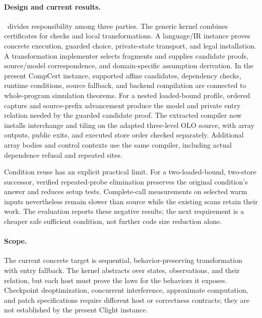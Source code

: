 \paragraph{Design and current results.}
\guardcert\ divides responsibility among three parties. The generic kernel
combines certificates for checks and local transformations. A language/IR
instance proves concrete execution, guarded choice, private-state transport,
and legal installation. A transformation implementer selects fragments and
supplies candidate proofs, source/model correspondence, and domain-specific
assumption derivation. In the present CompCert instance, supported affine
candidates, dependency checks, runtime conditions, source fallback, and backend
compilation are connected to whole-program simulation theorems. For a nested
loaded-bound profile, ordered capture and source-prefix advancement produce
the model and private entry relation needed by the guarded candidate proof.
The extracted compiler now installs interchange and tiling on the adapted
three-level OLO source, with array outputs, public exits, and executed store
order checked separately. Additional array bodies and control contexts use the
same compiler, including actual dependence refusal and repeated sites.

Condition reuse has an explicit practical limit. For a two-loaded-bound,
two-store successor, verified repeated-probe elimination preserves the original
condition's answer and reduces setup tests. Complete-call measurements on
selected warm inputs nevertheless remain slower than source while the
existing scans retain their work. The evaluation reports these negative results;
the next requirement is a cheaper safe sufficient condition, not further code
size reduction alone.


\paragraph{Scope.}
The current concrete target is sequential, behavior-preserving transformation
with entry fallback. The kernel abstracts over states, observations, and their
relation, but each host must prove the laws for the behaviors it exposes.
Checkpoint deoptimization, concurrent interference, approximate computation,
and patch specifications require different host or correctness contracts; they
are not established by the present Clight instance.
